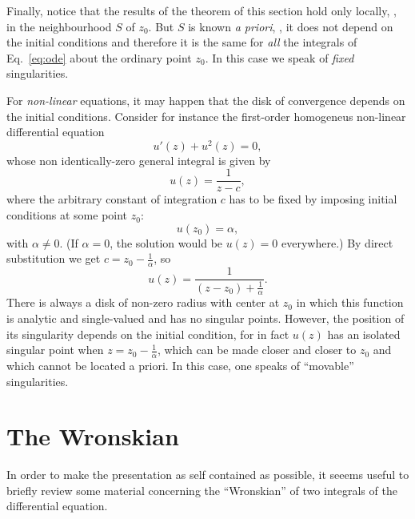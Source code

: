 Finally,  notice that the results of the
theorem of this section hold only locally, \ie, in the  neighbourhood $S$ of
$z_{0}$.  But $S$ is known \emph{a priori}, \ie, it does not depend on the
initial conditions and therefore it is the same for \emph{all} the integrals of
Eq.~\eqref{eq:ode} about the ordinary point $z_{0}$.  In this case we speak of
\emph{fixed} singularities.




For 
\emph{non-linear} equations, it may happen that the disk of convergence depends on
the initial conditions. Consider for instance the first-order
homogeneus non-linear differential equation
\begin{dmath*}
   u'(z) + u^{2}(z) = 0,
\end{dmath*}
whose non identically-zero general integral is given by
\begin{dmath*}
   u(z) = \frac{1}{z - c} ,
\end{dmath*}
where the arbitrary constant of integration $c$  has to be fixed by imposing
initial conditions at some point $z_{0}$:
\begin{dmath*}
   u(z_{0}) = \alpha ,
\end{dmath*}
with $\alpha \neq 0$.
(If $\alpha =0$, the solution would be $u(z) =0$ everywhere.)
By direct substitution we get
$c = z_{0} - \frac{1}{\alpha} $,  so
\begin{dmath*}
   u(z) = \frac{1}{(z-z_{0}) + \frac{1}{\alpha}} .
\end{dmath*}
There is always a disk of non-zero radius with center at $z_{0}$ in which this
function is analytic and single-valued and has no singular points.  However, the
position of its singularity depends on the initial condition, for in fact $u(z)$
has an isolated singular point when $z=z_{0} - \frac{1}{\alpha}$, which can be
made closer and closer to $z_{0}$ and which cannot be located a priori.  In this
case, one speaks of  ``movable'' singularities.



\section{The Wronskian}

In order to make the presentation as self contained as possible, it seeems
useful to briefly  review 
some material concerning the ``Wronskian'' of two integrals of the differential
equation. 


